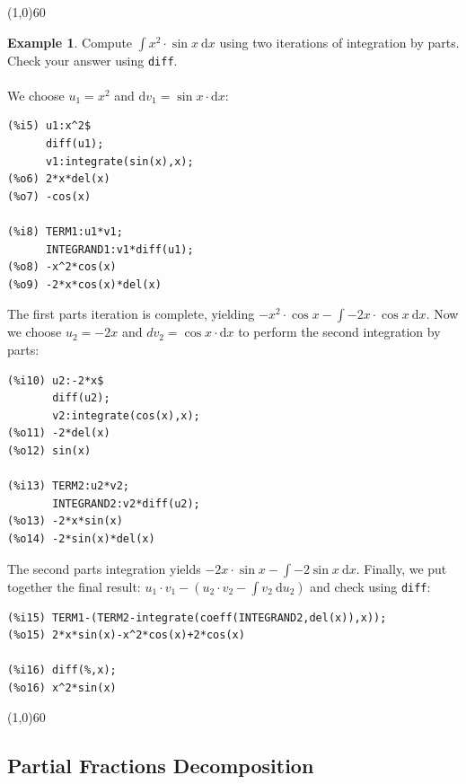 \documentclass[10.5pt,twoside]{report}
\theoremstyle{definition}
\newtheorem{exmp}{Example}[section]
\begin{document}
\line(1,0){60}
\linethickness{0.5mm}


\begin{exmp}  Compute $\displaystyle \int x^2\cdot \sin{x}\ \mathrm{d}x$ using two iterations of integration by parts.  Check your answer using \verb|diff|.\\

${}$\\

We choose $u_1=x^2$ and $\mathrm{d}v_1=\sin{x}\cdot \mathrm{d}x$:

\begin{verbatim}
(%i5) u1:x^2$
      diff(u1);
      v1:integrate(sin(x),x);
(%o6) 2*x*del(x)
(%o7) -cos(x)

(%i8) TERM1:u1*v1;
      INTEGRAND1:v1*diff(u1);
(%o8) -x^2*cos(x)
(%o9) -2*x*cos(x)*del(x)
\end{verbatim}

The first parts iteration is complete, yielding $-x^2\cdot \cos{x} -\displaystyle \int -2x\cdot \cos{x}\ \mathrm{d}x$.  Now we choose $u_2=-2x$ and $dv_2=\cos{x}\cdot \mathrm{d}x$ to perform the second integration by parts:

\begin{verbatim}
(%i10) u2:-2*x$
       diff(u2);
       v2:integrate(cos(x),x);
(%o11) -2*del(x)
(%o12) sin(x)

(%i13) TERM2:u2*v2;
       INTEGRAND2:v2*diff(u2);
(%o13) -2*x*sin(x)
(%o14) -2*sin(x)*del(x)
\end{verbatim}

The second parts integration yields $-2x\cdot \sin{x} - \displaystyle \int -2\sin{x}\ \mathrm{d}x$. Finally, we put together the final result:  $u_1\cdot v_1-\left(u_2\cdot v_2-\displaystyle \int v_2\ \mathrm{d}u_2\right)$ and check using \verb|diff|:

\begin{verbatim}
(%i15) TERM1-(TERM2-integrate(coeff(INTEGRAND2,del(x)),x));
(%o15) 2*x*sin(x)-x^2*cos(x)+2*cos(x)

(%i16) diff(%,x);
(%o16) x^2*sin(x)
\end{verbatim}

\end{exmp}

\line(1,0){60}
\linethickness{0.5mm}


\subsection{Partial Fractions Decomposition}
\end{document}
